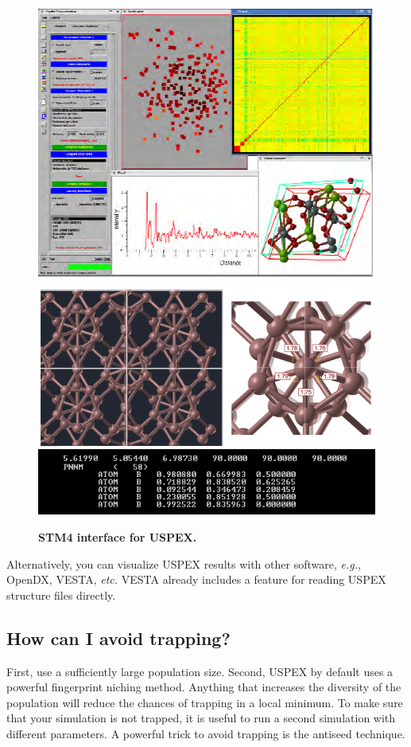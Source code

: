\documentclass[12pt]{article}
\begin{document}
\begin{figure}[hbtp]
\centering
\includegraphics[scale=0.3]{pic/STM_screenshot.png} 
\includegraphics[scale=0.4]{pic/B_structure}
\caption{\footnotesize \textbf{STM4 interface for USPEX.}}
\label{fig:STM4}
\end{figure}

Alternatively, you can visualize USPEX results with other software, \emph{e.g.},
OpenDX, VESTA, \emph{etc.} VESTA already includes a feature for reading USPEX
structure files directly.

\subsection{How can I avoid trapping?} \label{faq_trapping}
First, use a sufficiently large population size. Second, USPEX by default uses a
powerful fingerprint niching method. Anything that increases the diversity of
the population will reduce the chances of trapping in a local minimum. To make
sure that your simulation is not trapped, it is useful to run a second
simulation with different parameters. A powerful trick to avoid trapping is the
antiseed technique.
\end{document}
